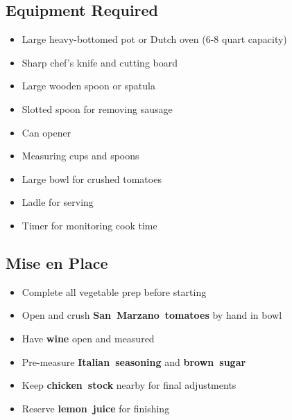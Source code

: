 \documentclass[11pt,letterpaper]{article}
\begin{document}
\newpage

{\small
\setlength{\columnsep}{20pt}
\setlength{\multicolsep}{6pt}
\begin{multicols}{2}
\setlength{\parindent}{0pt}
\setlength{\parskip}{4pt}

\subsection*{Equipment Required}
\begin{itemize}
    \item Large heavy-bottomed pot or Dutch oven (6-8 quart capacity)
    \item Sharp chef's knife and cutting board
    \item Large wooden spoon or spatula
    \item Slotted spoon for removing sausage
    \item Can opener
    \item Measuring cups and spoons
    \item Large bowl for crushed tomatoes
    \item Ladle for serving
    \item Timer for monitoring cook time
\end{itemize}

\subsection*{Mise en Place}
\begin{itemize}
    \item Complete all vegetable prep before starting
    \item Open and crush \textbf{San~Marzano~tomatoes} by hand in bowl
    \item Have \textbf{wine} open and measured
    \item Pre-measure \textbf{Italian~seasoning} and \textbf{brown~sugar}
    \item Keep \textbf{chicken~stock} nearby for final adjustments
    \item Reserve \textbf{lemon~juice} for finishing
\end{itemize}


\end{multicols}}
\end{document}

